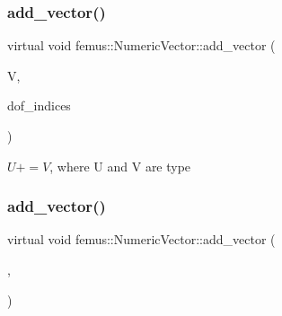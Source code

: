 \mbox{\label{classfemus_1_1_numeric_vector_a4cb61447e41df8d24311a54a10a5b291}} 
\subsubsection{\texorpdfstring{add\+\_\+vector()}{add\_vector()}\hspace{0.1cm}{\footnotesize\ttfamily [2/4]}}
{\footnotesize\ttfamily virtual void femus\+::\+Numeric\+Vector\+::add\+\_\+vector (\begin{DoxyParamCaption}\item[{const \mbox{\hyperlink{classfemus_1_1_numeric_vector}{Numeric\+Vector}} \&}]{V,  }\item[{const std\+::vector$<$ int $>$ \&}]{dof\+\_\+indices }\end{DoxyParamCaption})\hspace{0.3cm}{\ttfamily [pure virtual]}}



$U+=V$, where U and V are type 

\mbox{\label{classfemus_1_1_numeric_vector_a279b5c283fc92dbaa2b1d09dbf70e231}} 
\subsubsection{\texorpdfstring{add\+\_\+vector()}{add\_vector()}\hspace{0.1cm}{\footnotesize\ttfamily [3/4]}}
{\footnotesize\ttfamily virtual void femus\+::\+Numeric\+Vector\+::add\+\_\+vector (\begin{DoxyParamCaption}\item[{const \mbox{\hyperlink{classfemus_1_1_numeric_vector}{Numeric\+Vector}} \&}]{,  }\item[{const \mbox{\hyperlink{classfemus_1_1_sparse_matrix}{Sparse\+Matrix}} \&}]{ }\end{DoxyParamCaption})\hspace{0.3cm}{\ttfamily [pure virtual]}}



